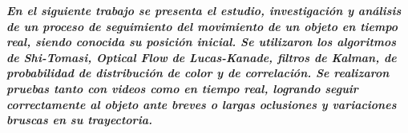 \textbf{\textit{En el siguiente trabajo se presenta el estudio, investigación y análisis de un proceso de seguimiento del movimiento de un objeto en tiempo real, siendo conocida su posición inicial. Se utilizaron los algoritmos de Shi-Tomasi, Optical Flow de Lucas-Kanade, filtros de Kalman, de probabilidad de distribución de color y de correlación. Se realizaron pruebas tanto con videos como en tiempo real, logrando seguir correctamente al objeto ante breves o largas oclusiones y variaciones bruscas en su trayectoria. }}